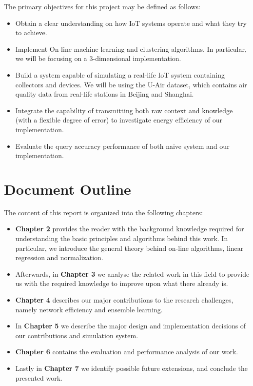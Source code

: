 \documentclass{mproj}
\begin{document}
The primary objectives for this project may be defined as follows:
\begin{itemize}  
\item Obtain a clear understanding on how IoT systems operate and what they try to achieve.
\item Implement On-line machine learning and clustering algorithms. In particular, we will be focusing on a 3-dimensional implementation.
\item Build a system capable of simulating a real-life IoT system containing collectors and devices. We will be using the U-Air \cite{air-quality-inference-meets-big-data} dataset, which contains air quality data from real-life stations in Beijing and Shanghai.
\item Integrate the capability of transmitting both raw context and knowledge (with a flexible degree of error) to investigate energy efficiency of our implementation.
\item Evaluate the query accuracy performance of both naive system and our implementation.
\end{itemize}

\section{Document Outline}
The content of this report is organized into the following chapters:
\begin{itemize}
\item \textbf{Chapter 2} provides the reader with the background knowledge required for understanding the basic principles and algorithms behind this work. In particular, we introduce the general theory behind on-line algorithms, linear regression and normalization.
\item Afterwards, in \textbf{Chapter 3} we analyse the related work in this field to provide us with the required knowledge to improve upon what there already is.
\item \textbf{Chapter 4} describes our major contributions to the research challenges, namely network efficiency and ensemble learning.
\item In \textbf{Chapter 5} we describe the major design and implementation decisions of our contributions and simulation system.
\item \textbf{Chapter 6} contains the evaluation and performance analysis of our work.
\item Lastly in \textbf{Chapter 7} we identify possible future extensions, and conclude the presented work.
\end{itemize}
\end{document}
